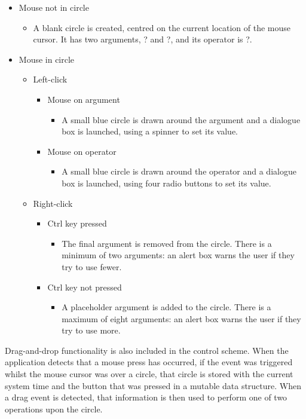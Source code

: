 \documentclass[12pt,twoside,notitlepage,xetex]{report}
\begin{document}
\begin{itemize}
\item Mouse not in circle
\begin{itemize}
\item A blank circle is created, centred on the current location of the mouse cursor.  It has two arguments, {\sfapp ?} and {\sfapp ?}, and its operator is {\sfapp ?}.
\end{itemize}
\item Mouse in circle
\begin{itemize}
\item Left-click
\begin{itemize}
\item Mouse on argument
\begin{itemize}
\item A small blue circle is drawn around the argument and a dialogue box is launched, using a spinner to set its value.
\end{itemize}
\item Mouse on operator
\begin{itemize}
\item A small blue circle is drawn around the operator and a dialogue box is launched, using four radio buttons to set its value.
\end{itemize}
\end{itemize}
\item Right-click
\begin{itemize}
\item Ctrl key pressed
\begin{itemize}
\item The final argument is removed from the circle.  There is a minimum of two arguments: an alert box warns the user if they try to use fewer.
\end{itemize}
\item Ctrl key not pressed
\begin{itemize}
\item A placeholder argument is added to the circle.  There is a maximum of eight arguments: an alert box warns the user if they try to use more.
\end{itemize}
\end{itemize}
\end{itemize}
\end{itemize}

Drag-and-drop functionality is also included in the control scheme.  When the application detects that a mouse press has occurred, if the event was triggered whilst the mouse cursor was over a circle, that circle is stored with the current system time and the button that was pressed in a mutable data structure.  When a drag event is detected, that information is then used to perform one of two operations upon the circle.
\end{document}
